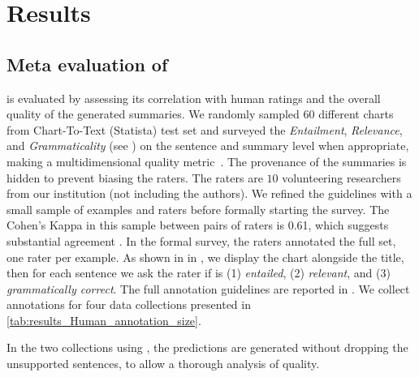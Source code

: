 \section{Results}
\subsection{Meta evaluation of \metric}
\label{subsec:evaluation-setup}

\metric{} is evaluated by assessing its correlation with human ratings and the overall quality of the generated summaries.
We randomly sampled $60$ different charts from Chart-To-Text (Statista) test set and surveyed the \emph{Entailment}, \emph{Relevance}, and \emph{Grammaticality} (see ) on the sentence and summary level when appropriate, making a multidimensional quality metric~\cite{huang-etal-2020-achieved}.
The provenance of the summaries is hidden to prevent biasing the raters. The raters are $10$ volunteering researchers from our institution (not including the authors).
We refined the guidelines with a small sample of examples and raters before formally starting the survey. The Cohen’s Kappa in this sample between pairs of raters is 0.61, which suggests substantial agreement \citep{landis1977measurement}. In the formal survey, the raters annotated the full set, one rater per example. 
As shown in  in , we display the chart alongside the title, then for each sentence we ask the rater if is (1) \emph{entailed}, (2) \emph{relevant}, and (3) \emph{grammatically correct}.
The full annotation guidelines are reported in . We collect annotations for four data collections presented in \cref{tab:results_Human_annotation_size}. 
\begin{table}[ht]
\centering
\vspace{-0.5ex}
\caption{Human annotation data collections sizes. \piemoji: \pipeline generates a set of 10 candidates using PALM-2, and \criticemoji: \metric considers either the original tables or the generated ones using DePLot.}
\label{tab:results_Human_annotation_size} 
\end{table}
In the two collections using \pipeline, the predictions are generated without dropping the unsupported sentences, to allow a thorough analysis of \metric quality.

